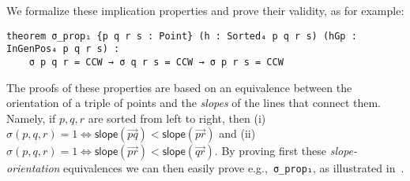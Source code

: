 We formalize these implication properties and prove their validity, as for example:
\begin{lstlisting}
theorem σ_prop₁ {p q r s : Point} (h : Sorted₄ p q r s) (hGp : InGenPos₄ p q r s) :
    σ p q r = CCW → σ q r s = CCW → σ p r s = CCW
\end{lstlisting}


The proofs of these properties are based on an equivalence between the orientation of a triple of points and the \emph{slopes} of the lines that connect them. Namely, if $p, q, r$  are sorted from left to right, then (i) $\sigma(p,q,r)=1 \iff \textsf{slope}(\vec{pq}) < \textsf{slope}(\vec{pr})$  and (ii) $\sigma(p,q,r)=1 \iff \textsf{slope}(\vec{pr}) < \textsf{slope}(\vec{qr})$. By proving first these \emph{slope-orientation} equivalences we can then easily prove e.g.,~\lstinline|σ_prop₁|, as illustrated in~.

